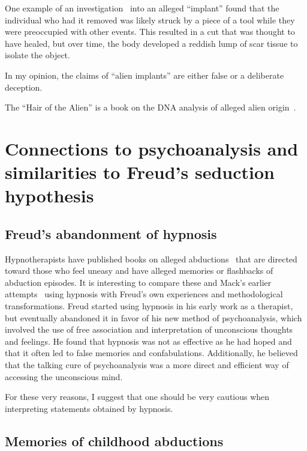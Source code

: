 One example of an investigation~\cite{ScottLittle-implant} into an alleged ``implant'' found that the individual who had it removed was likely struck by a piece of a tool while they were preoccupied with other events. This resulted in a cut that was thought to have healed, but over time, the body developed a reddish lump of scar tissue to isolate the object.

In my opinion, the claims of ``alien implants'' are either false or a deliberate deception.

The ``Hair of the Alien'' is a book on the DNA analysis of alleged alien origin~\cite{Chalker2005Jul}.


\section{Connections to psychoanalysis and similarities to Freud's seduction hypothesis}
\label{2023-UFO-part-Perception-abductions-sfsh}

\subsection{Freud's abandonment of hypnosis}

Hypnotherapists have published books on alleged abductions~\cite{Marden2019Aug,Lalich2020,Smith2008Feb}
that are directed toward those who feel uneasy and have alleged memories or flashbacks of abduction episodes.
It is interesting to compare these and Mack's earlier attempts~\cite{Mack1994Apr,Mack1999PC} using hypnosis
with Freud's own experiences and methodological transformations.
Freud started using hypnosis in his early work as a therapist,
but eventually abandoned it in favor of his new method of psychoanalysis,
which involved the use of free association and interpretation of unconscious thoughts and feelings.
He found that hypnosis was not as effective as he had hoped and that it often led to false memories and confabulations.
Additionally, he believed that the talking cure of psychoanalysis
was a more direct and efficient way of accessing the unconscious mind.

For these very reasons, I suggest that one should be very cautious when interpreting statements obtained by hypnosis.


\subsection{Memories of childhood abductions}

